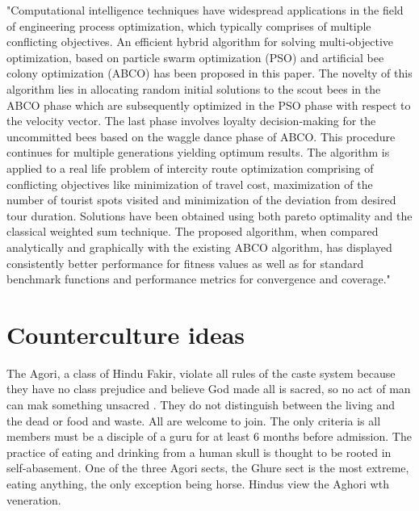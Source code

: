 \documentclass[a4paper,11pt]{article}
\begin{document}
"Computational intelligence techniques have widespread applications in the field of engineering process optimization, which typically comprises of multiple conflicting objectives. An efficient hybrid algorithm for solving multi‐objective optimization, based on particle swarm optimization (PSO) and artificial bee colony optimization (ABCO) has been proposed in this paper. The novelty of this algorithm lies in allocating random initial solutions to the scout bees in the ABCO phase which are subsequently optimized in the PSO phase with respect to the velocity vector. The last phase involves loyalty decision‐making for the uncommitted bees based on the waggle dance phase of ABCO. This procedure continues for multiple generations yielding optimum results. The algorithm is applied to a real life problem of intercity route optimization comprising of conflicting objectives like minimization of travel cost, maximization of the number of tourist spots visited and minimization of the deviation from desired tour duration. Solutions have been obtained using both pareto optimality and the classical weighted sum technique. The proposed algorithm, when compared analytically and graphically with the existing ABCO algorithm, has displayed consistently better performance for fitness values as well as for standard benchmark functions and performance metrics for convergence and coverage."\cite{beed2020hybrid}


\section{Counterculture ideas}

The Agori, a class of Hindu Fakir, violate all rules of the caste system because they have no class prejudice and believe God made all is sacred, so no act of man can mak something unsacred \cite{balfour1897life}. They do not distinguish between the living and the dead or food and waste. All are welcome to join. The only criteria is all members must be a disciple of a guru for at least 6 months before admission. The practice of eating and drinking from a human skull is thought to be rooted in self-abasement. One of the three Agori sects, the Ghure sect is the most extreme, eating anything, the only exception being horse. Hindus view the Aghori wth veneration. 





\newpage
\end{document}
